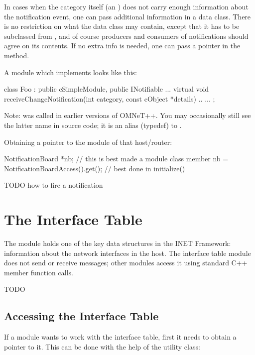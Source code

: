 In cases when the category itself (an ) does not carry enough
information about the notification event, one can pass additional
information in a data class. There is no restriction on what the data class
may contain, except that it has to be subclassed from ,
and of course producers and consumers of notifications should agree on its
contents. If no extra info is needed, one can pass a  pointer in
the  method.

A module which implements  looks like this:

\begin{cpp}
class Foo : public cSimpleModule, public INotifiable {
    ...
    virtual void receiveChangeNotification(int category, const cObject *details) {..}
    ...
};
\end{cpp}

Note:  was called  in earlier versions
of OMNeT++. You may occasionally still see the latter name in source code; it
is an alias (typedef) to .

Obtaining a pointer to the  module of that host/router:

\begin{cpp}
NotificationBoard *nb; // this is best made a module class member
nb = NotificationBoardAccess().get();  // best done in initialize()
\end{cpp}

TODO how to fire a notification
\fi


\section{The Interface Table}

The  module holds one of the key data structures in
the INET Framework: information about the network interfaces in the host.
The interface table module does not send or receive messages; other modules
access it using standard C++ member function calls.

\ifdraft TODO
\subsection{Accessing the Interface Table}

If a module wants to work with the interface table, first it needs to obtain a
pointer to it. This can be done with the help of the
 utility class:

